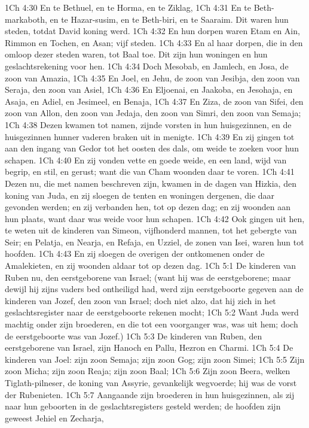 1Ch 4:30  En te Bethuel, en te Horma, en te Ziklag,
1Ch 4:31  En te Beth-markaboth, en te Hazar-susim, en te Beth-biri, en te Saaraim. Dit waren hun steden, totdat David koning werd.
1Ch 4:32  En hun dorpen waren Etam en Ain, Rimmon en Tochen, en Asan; vijf steden.
1Ch 4:33  En al haar dorpen, die in den omloop dezer steden waren, tot Baal toe. Dit zijn hun woningen en hun geslachtsrekening voor hen.
1Ch 4:34  Doch Mesobab, en Jamlech, en Josa, de zoon van Amazia,
1Ch 4:35  En Joel, en Jehu, de zoon van Jesibja, den zoon van Seraja, den zoon van Asiel,
1Ch 4:36  En Eljoenai, en Jaakoba, en Jesohaja, en Asaja, en Adiel, en Jesimeel, en Benaja,
1Ch 4:37  En Ziza, de zoon van Sifei, den zoon van Allon, den zoon van Jedaja, den zoon van Simri, den zoon van Semaja;
1Ch 4:38  Dezen kwamen tot namen, zijnde vorsten in hun huisgezinnen, en de huisgezinnen hunner vaderen braken uit in menigte.
1Ch 4:39  En zij gingen tot aan den ingang van Gedor tot het oosten des dals, om weide te zoeken voor hun schapen.
1Ch 4:40  En zij vonden vette en goede weide, en een land, wijd van begrip, en stil, en gerust; want die van Cham woonden daar te voren.
1Ch 4:41  Dezen nu, die met namen beschreven zijn, kwamen in de dagen van Hizkia, den koning van Juda, en zij sloegen de tenten en woningen dergenen, die daar gevonden werden; en zij verbanden hen, tot op dezen dag; en zij woonden aan hun plaats, want daar was weide voor hun schapen.
1Ch 4:42  Ook gingen uit hen, te weten uit de kinderen van Simeon, vijfhonderd mannen, tot het gebergte van Seir; en Pelatja, en Nearja, en Refaja, en Uzziel, de zonen van Isei, waren hun tot hoofden.
1Ch 4:43  En zij sloegen de overigen der ontkomenen onder de Amalekieten, en zij woonden aldaar tot op dezen dag.
1Ch 5:1  De kinderen van Ruben nu, den eerstgeborene van Israel; (want hij was de eerstgeborene; maar dewijl hij zijns vaders bed ontheiligd had, werd zijn eerstgeboorte gegeven aan de kinderen van Jozef, den zoon van Israel; doch niet alzo, dat hij zich in het geslachtsregister naar de eerstgeboorte rekenen mocht;
1Ch 5:2  Want Juda werd machtig onder zijn broederen, en die tot een voorganger was, was uit hem; doch de eerstgeboorte was van Jozef.)
1Ch 5:3  De kinderen van Ruben, den eerstgeborene van Israel, zijn Hanoch en Pallu, Hezron en Charmi.
1Ch 5:4  De kinderen van Joel: zijn zoon Semaja; zijn zoon Gog; zijn zoon Simei;
1Ch 5:5  Zijn zoon Micha; zijn zoon Reaja; zijn zoon Baal;
1Ch 5:6  Zijn zoon Beera, welken Tiglath-pilneser, de koning van Assyrie, gevankelijk wegvoerde; hij was de vorst der Rubenieten.
1Ch 5:7  Aangaande zijn broederen in hun huisgezinnen, als zij naar hun geboorten in de geslachtsregisters gesteld werden; de hoofden zijn geweest Jehiel en Zecharja,
